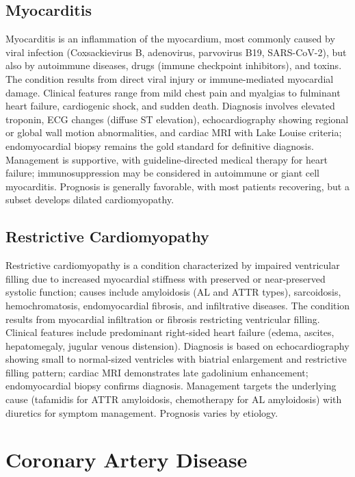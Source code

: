 \subsection{Myocarditis}
\label{sec:Myocarditis}
Myocarditis is an inflammation of the myocardium, most commonly caused by viral infection (Coxsackievirus B, adenovirus, parvovirus B19, SARS-CoV-2), but also by autoimmune diseases, drugs (immune checkpoint inhibitors), and toxins. The condition results from direct viral injury or immune-mediated myocardial damage. Clinical features range from mild chest pain and myalgias to fulminant heart failure, cardiogenic shock, and sudden death. Diagnosis involves elevated troponin, ECG changes (diffuse ST elevation), echocardiography showing regional or global wall motion abnormalities, and cardiac MRI with Lake Louise criteria; endomyocardial biopsy remains the gold standard for definitive diagnosis. Management is supportive, with guideline-directed medical therapy for heart failure; immunosuppression may be considered in autoimmune or giant cell myocarditis. Prognosis is generally favorable, with most patients recovering, but a subset develops dilated cardiomyopathy.

\subsection{Restrictive Cardiomyopathy}
\label{sec:Restrictive Cardiomyopathy}
Restrictive cardiomyopathy is a condition characterized by impaired ventricular filling due to increased myocardial stiffness with preserved or near-preserved systolic function; causes include amyloidosis (AL and ATTR types), sarcoidosis, hemochromatosis, endomyocardial fibrosis, and infiltrative diseases. The condition results from myocardial infiltration or fibrosis restricting ventricular filling. Clinical features include predominant right-sided heart failure (edema, ascites, hepatomegaly, jugular venous distension). Diagnosis is based on echocardiography showing small to normal-sized ventricles with biatrial enlargement and restrictive filling pattern; cardiac MRI demonstrates late gadolinium enhancement; endomyocardial biopsy confirms diagnosis. Management targets the underlying cause (tafamidis for ATTR amyloidosis, chemotherapy for AL amyloidosis) with diuretics for symptom management. Prognosis varies by etiology.

\section{Coronary Artery Disease}

